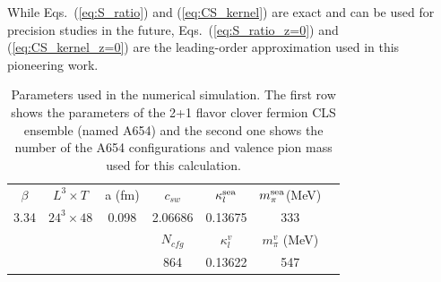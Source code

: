 While Eqs.~(\ref{eq:S_ratio}) and (\ref{eq:CS_kernel}) are exact and can be
used for precision {studies} in the future,  Eqs.~(\ref{eq:S_ratio_z=0}) and (\ref{eq:CS_kernel_z=0}) are the leading-order approximation used in this pioneering  work.


\begin{table}[htbp]
\begin{center}
\caption{\label{table:cls} Parameters used  in the numerical simulation. The first row shows the parameters of the 2+1 flavor clover fermion CLS ensemble (named A654) and the second one shows the number of the A654 configurations and valence pion mass used for this calculation.}
\begin{tabular}{ccccccc}
\hline
 $\beta$ & $L^3\times T$  &a (fm)  & $c_{sw}$  & $\kappa^{\rm sea}_l$ & $m^{\rm sea}_{\pi} $(MeV)\\
  3.34 & $24^3 \times  48$ & 0.098 &  2.06686  & 0.13675 & 333 \\
\hline
&&& $N_{cfg}$  &  $\kappa^{v}_l$  & $m^v_{\pi} $ (MeV)  \\
  &&&  864  & 0.13622   & 547 \\
 \hline
\end{tabular}
\end{center}
\end{table}
